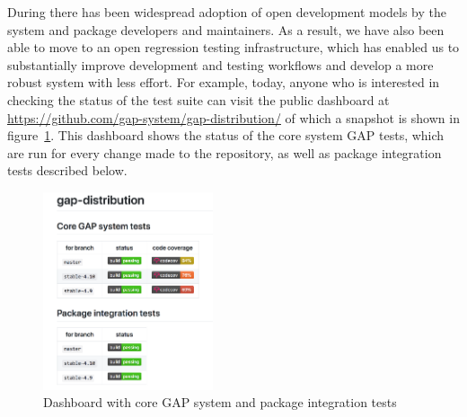 
%
%

During \ODK there has been widespread adoption of open development models by the
\GAP system and package developers and
maintainers. As a result, we have also been able to move
to an open regression testing infrastructure, which has enabled us
to substantially improve \GAP development and testing workflows and
develop a more robust system with less effort. For example,
today, anyone who is interested in checking the
status of the \GAP test suite can visit the public dashboard at
\url{https://github.com/gap-system/gap-distribution/} of which a
snapshot is shown in figure~\ref{fig:gap-core-tests}.
This dashboard shows the status of the core system GAP tests,
which are run for every change made to the repository, as well as
package integration tests described below.

\begin{figure}[!ht]
    \centering
    \includegraphics[width=5cm]{images/gap-core-tests}
    \caption{Dashboard with core GAP system and package integration tests}
    \label{fig:gap-core-tests}
\end{figure}



